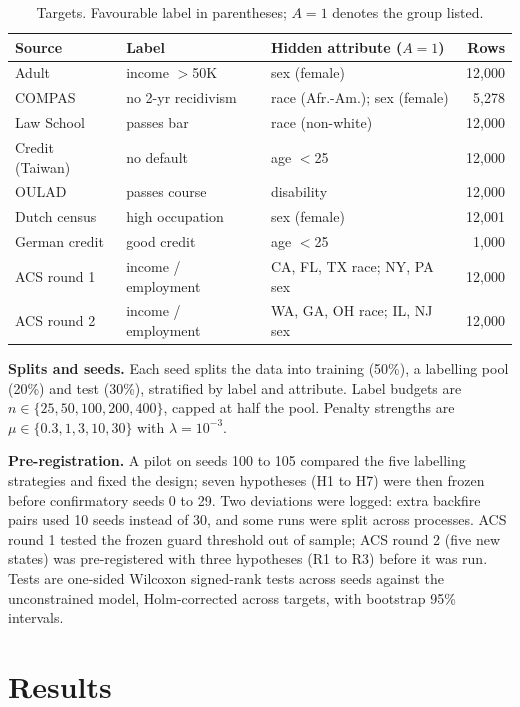 \documentclass[conference]{IEEEtran}
\begin{document}
\begin{table}[t]
\caption{Targets. Favourable label in parentheses; $A{=}1$ denotes the group listed.}
\label{tab:data}
\centering
\scriptsize
\setlength{\tabcolsep}{2.5pt}
\begin{tabular}{@{}lllr@{}}
\toprule
Source & Label & Hidden attribute ($A{=}1$) & Rows \\
\midrule
Adult & income $>$50K & sex (female) & 12{,}000 \\
COMPAS & no 2-yr recidivism & race (Afr.-Am.); sex (female) & 5{,}278 \\
Law School & passes bar & race (non-white) & 12{,}000 \\
Credit (Taiwan) & no default & age $<$25 & 12{,}000 \\
OULAD & passes course & disability & 12{,}000 \\
Dutch census & high occupation & sex (female) & 12{,}001 \\
German credit & good credit & age $<$25 & 1{,}000 \\
\midrule
ACS round 1 & income / employment & CA, FL, TX race; NY, PA sex & 12{,}000 \\
ACS round 2 & income / employment & WA, GA, OH race; IL, NJ sex & 12{,}000 \\
\bottomrule
\end{tabular}
\end{table}

\textbf{Splits and seeds.} Each seed splits the data into training (50\%), a labelling pool (20\%) and test (30\%), stratified by label and attribute. Label budgets are $n\in\{25,50,100,200,400\}$, capped at half the pool. Penalty strengths are $\mu\in\{0.3,1,3,10,30\}$ with $\lambda=10^{-3}$.

\textbf{Pre-registration.} A pilot on seeds 100 to 105 compared the five labelling strategies and fixed the design; seven hypotheses (H1 to H7) were then frozen before confirmatory seeds 0 to 29. Two deviations were logged: extra backfire pairs used 10 seeds instead of 30, and some runs were split across processes. ACS round 1 tested the frozen guard threshold out of sample; ACS round 2 (five new states) was pre-registered with three hypotheses (R1 to R3) before it was run. Tests are one-sided Wilcoxon signed-rank tests across seeds against the unconstrained model, Holm-corrected across targets, with bootstrap 95\% intervals.

\section{Results}
\end{document}
